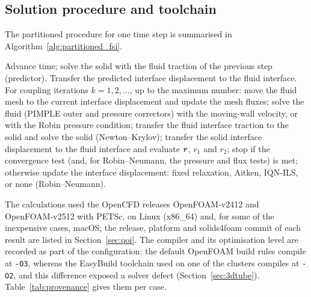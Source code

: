 \subsection{Solution procedure and toolchain}\label{sec:implementation_details}

The partitioned procedure for one time step is summarised in Algorithm~\ref{alg:partitioned_fsi}.

\begin{algorithm}[htbp]
\caption{Partitioned FSI procedure for one time step (solids4foam \texttt{fluidSolidInterface}).}
\label{alg:partitioned_fsi}
\begin{algorithmic}[1]
\State Advance time; solve the solid with the fluid traction of the previous step (predictor).
\State Transfer the predicted interface displacement to the fluid interface.
\State For coupling iterations $k = 1, 2, \ldots$, up to the maximum number:
\State \hspace{1.5em}move the fluid mesh to the current interface displacement and update the mesh fluxes;
\State \hspace{1.5em}solve the fluid (PIMPLE outer and pressure correctors) with the moving-wall velocity, or with the Robin pressure condition;
\State \hspace{1.5em}transfer the fluid interface traction to the solid and solve the solid (Newton--Krylov);
\State \hspace{1.5em}transfer the solid interface displacement to the fluid interface and evaluate $\boldsymbol{r}$, $r_1$ and $r_2$;
\State \hspace{1.5em}stop if the convergence test (and, for Robin--Neumann, the pressure and flux tests) is met;
\State \hspace{1.5em}otherwise update the interface displacement: fixed relaxation, Aitken, IQN-ILS, or none (Robin--Neumann).
\end{algorithmic}
\end{algorithm}

The calculations used the OpenCFD releases OpenFOAM-v2412 and OpenFOAM-v2512 with PETSc, on Linux (x86\_64) and, for some of the inexpensive cases, macOS; the release, platform and solids4foam commit of each result are listed in Section~\ref{sec:qoi}.
The compiler and its optimisation level are recorded as part of the configuration: the default OpenFOAM build rules compile at \texttt{-O3}, whereas the EasyBuild toolchain used on one of the clusters compiles at \texttt{-O2}, and this difference exposed a solver defect (Section~\ref{sec:3dtube}).
Table~\ref{tab:provenance} gives them per case.
